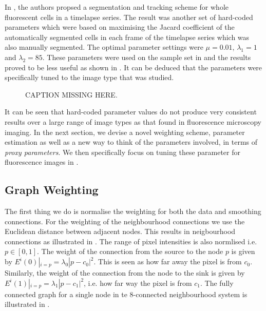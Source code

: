 In \citep{Maska2013}, the authors propsed a segmentation and tracking scheme for whole fluorescent cells in a timelapse series. The result was another set of hard-coded parameters which were based on maximising the Jacard coefficient of the automatically segmented cells in each frame of the timelapse series which was also manually segmented. The optimal parameter settings were $\mu=0.01$, $\lambda_1=1$ and $\lambda_2 = 85$. These parameters were used on the sample set in  and the results proved to be less useful as shown in . It can be deduced that the parameters were specifically tuned to the image type that was studied.

\begin{figure}[!t]
	\centering
	\caption{CAPTION MISSING HERE.}
	\label{fig:samplesetcelltrack}
\end{figure}

It can be seen that hard-coded parameter values do not produce very consistent results over a large range of image types as that found in fluorescence microscopy imaging. In the next section,  we devise a novel weighting scheme, parameter estimation as well as a new way to think of the parameters involved, in terms of \textit{proxy parameters}. We then specifically focus on tuning these parameter for fluorescence images in .

\subsection{Graph Weighting}
\label{sec:cvgc_weighting}

The first thing we do is normalise the weighting for both the data and smoothing connections. For the weighting of the neighbourhood connections we use the Euclidean distance between adjacent nodes. This results in neigbourhood connections as illustrated in . The range of pixel intensities is also normlised i.e. $p \in [0,1]$. The weight of the connection from the source to the node $p$ is given by $E^i(0)|_{i=p} = \lambda_0|p-c_0|^2$. This is seen as how far away the pixel is from $c_0$. Similarly, the weight of the connection from the node to the sink is given by $E^i(1)|_{i=p}=\lambda_1|p-c_1|^2$, i.e. how far way the pixel is from $c_1$. The fully connected graph for a single node in te 8-connected neighbourhood system is illustrated in .

